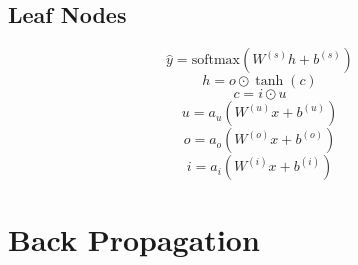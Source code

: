 \documentclass[12pt]{article}
\begin{document}
\subsection{Leaf Nodes}
\begin{equation}
	\hat{y} = \text{softmax}(W^{(s)}h+b^{(s)})
\end{equation}
\begin{equation}
	h = o \odot \tanh(c)
\end{equation}
\begin{equation}
	c = i \odot u
\end{equation}
\begin{equation}
	u = a_u(W^{(u)}x+b^{(u)})
\end{equation}
\begin{equation}
	o = a_o(W^{(o)}x+b^{(o)})
\end{equation}
\begin{equation}
	i = a_i(W^{(i)}x+b^{(i)})
\end{equation}

\section{Back Propagation}
\end{document}
